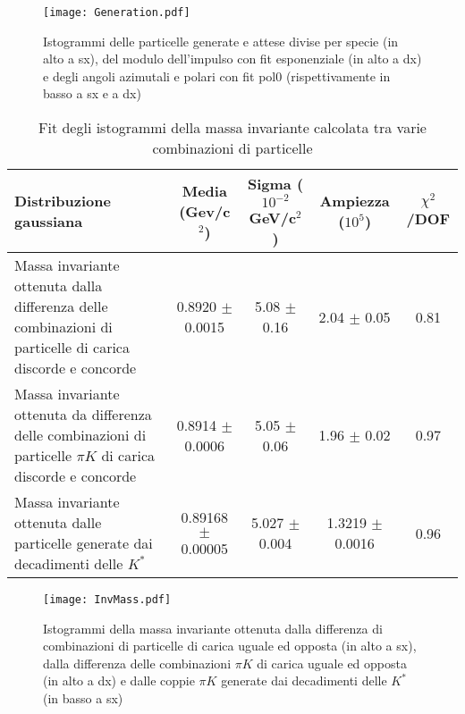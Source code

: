 \documentclass[a4paper,10pt]{article}
\begin{document}
\begin{figure*}[p]
  \centering
  \texttt{[image: Generation.pdf]}
  \caption{Istogrammi delle particelle generate e attese divise per specie (in alto a sx), del modulo dell'impulso con fit esponenziale (in alto a dx) e degli angoli azimutali e polari con fit pol0 (rispettivamente in basso a sx e a dx)}
  \label{fig:Generation}
\end{figure*}

\begin{table*}
  \caption{Fit degli istogrammi della massa invariante calcolata tra varie combinazioni di particelle}
  \label{tab:fitgaus}
  \centering
  \begin{tabular}{p{4.5cm}cccc}
    \toprule
    Distribuzione gaussiana                                                                                        & Media (Gev/c$^2$)     & Sigma ($10^{-2}$ GeV/c$^2$) & Ampiezza ($10^5$)   & $\chi^2$/DOF \\
    \midrule
    Massa invariante ottenuta dalla differenza delle combinazioni di particelle di carica discorde e concorde      & 0.8920 $\pm$ 0.0015   & 5.08 $\pm$ 0.16             & 2.04 $\pm$ 0.05     & 0.81         \\
    \midrule
    Massa invariante ottenuta da differenza delle combinazioni di particelle $\pi K$ di carica discorde e concorde & 0.8914 $\pm$ 0.0006   & 5.05 $\pm$ 0.06             & 1.96 $\pm$ 0.02     & 0.97         \\
    \midrule
    Massa invariante ottenuta dalle particelle generate dai decadimenti delle $K^*$                                & 0.89168 $\pm$ 0.00005 & 5.027 $\pm$ 0.004           & 1.3219 $\pm$ 0.0016 & 0.96         \\
    \bottomrule
  \end{tabular}
\end{table*}

\begin{figure*}[t]
  \centering
  \texttt{[image: InvMass.pdf]}
  \caption{Istogrammi della massa invariante ottenuta dalla differenza di combinazioni di particelle di carica uguale ed opposta (in alto a sx), dalla differenza delle combinazioni $\pi K$ di carica uguale ed opposta (in alto a dx) e dalle coppie $\pi K$ generate dai decadimenti delle $K^*$ (in basso a sx)}
  \label{fig:InvMass}
\end{figure*}

\newpage
\lstlistoflistings









\end{document}

